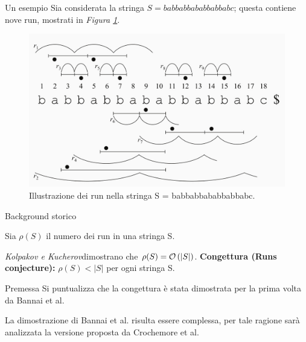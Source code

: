 \documentclass{beamer}
\begin{document}
    \begin{frame}{Un esempio}
        Sia considerata la stringa \(S = babbabbababbabbabc\); questa contiene nove 
        run, mostrati in \emph{Figura \ref{fig:1}}.

        \begin{figure}[!h]
            \centering
            \includegraphics[scale = .85]{../Extra/run example.jpg}
            \caption{Illustrazione dei run nella stringa S = babbabbababbabbabc.}
            \label{fig:1}
        \end{figure}
    \end{frame}
    \begin{frame}{Background storico}

        Sia \(\rho(S)\) il numero dei run in una stringa S.

        \emph{Kolpakov \emph{e} Kucherov}\footnotemark[1]
        dimostrano che \(\rho(S) = \mathcal{O} \left\lparen |S| \right\rparen\).
        \vskip 10pt
        \textbf{Congettura (Runs conjecture):} \(\rho (S) < |S|\) per ogni stringa S.

    \end{frame}
    \begin{frame}{Premessa}
        Si puntualizza che la congettura è stata dimostrata per la prima 
        volta da Bannai et al.\footnotemark[2]
        
        La dimostrazione di Bannai et al. risulta essere complessa,
        per tale ragione sarà analizzata la versione proposta da Crochemore et al.\footnotemark[3]


    \end{frame}
\end{document}
